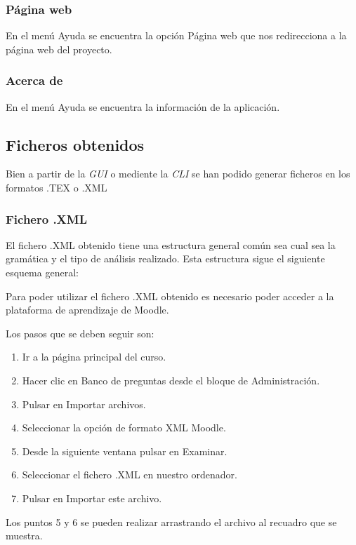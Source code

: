 \subsubsection{Página web}
En el menú Ayuda se encuentra la opción Página web que nos redirecciona a la página web del proyecto.

\subsubsection{Acerca de}
En el menú Ayuda se encuentra la información de la aplicación.

\subsection{Ficheros obtenidos}

Bien a partir de la \textit{GUI} o mediente la \textit{CLI} se han podido generar ficheros en los formatos .TEX o .XML
\newpage
\subsubsection{Fichero .XML}

El fichero .XML obtenido tiene una estructura general común sea cual sea la gramática y el tipo de análisis realizado. Esta estructura sigue el siguiente esquema general:

Para poder utilizar el fichero .XML obtenido es necesario poder acceder a la plataforma de aprendizaje de Moodle.

Los pasos que se deben seguir son:
\begin{enumerate}
\item Ir a la página principal del curso.
\item Hacer clic en Banco de preguntas desde el bloque de Administración.
\item Pulsar en Importar archivos.
\item Seleccionar la opción de formato XML Moodle.
\item Desde la siguiente ventana pulsar en Examinar.
\item Seleccionar el fichero .XML en nuestro ordenador.
\item Pulsar en Importar este archivo.
\end{enumerate}

Los puntos 5 y 6 se pueden realizar arrastrando el archivo al recuadro que se muestra.


